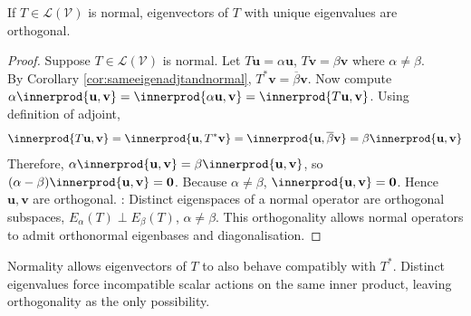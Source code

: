 \begin{corollary} \label{cor:normaleigenvectororthogonal} If  $T \in \mathcal{L}(\mathcal{V})$ is normal, eigenvectors of $T$ with unique eigenvalues are orthogonal.
\begin{proof} Suppose $T \in \mathcal{L}(\mathcal{V})$ is normal. Let $T \mathbf{u} = \alpha \mathbf{u}$, $T \mathbf{v} = \beta \mathbf{v}$ where $\alpha \neq \beta$.\\
By Corollary \ref{cor:sameeigenadjtandnormal}, $T^* \mathbf{v} = \overline{\beta}\mathbf{v}$. Now compute $\alpha \innerprod{\mathbf{u}, \mathbf{v}} = \innerprod{\alpha \mathbf{u}, \mathbf{v}} = \innerprod{T \mathbf{u}, \mathbf{v}}$. Using definition of adjoint,
\begin{align}
\innerprod{T \mathbf{u}, \mathbf{v}} = \innerprod{\mathbf{u}, T^* \mathbf{v}} = \innerprod{\mathbf{u}, \overline{\beta}\mathbf{v}} = \beta \innerprod{\mathbf{u}, \mathbf{v}} \nonumber
\end{align}
Therefore, $\alpha \innerprod{\mathbf{u}, \mathbf{v}} = \beta \innerprod{\mathbf{u}, \mathbf{v}}$, so $(\alpha - \beta)\innerprod{\mathbf{u}, \mathbf{v}} = \mathbf{0}$. Because $\alpha \neq \beta$, $\innerprod{\mathbf{u}, \mathbf{v}} = \mathbf{0}$. Hence $\mathbf{u}, \mathbf{v}$ are orthogonal.
: Distinct eigenspaces of a normal operator are orthogonal subspaces, $E_{\alpha}(T) \perp E_{\beta}(T)$, $\alpha \neq \beta$. This orthogonality allows normal operators to admit orthonormal eigenbases and diagonalisation.
\end{proof}
\end{corollary}

Normality allows eigenvectors of $T$ to also behave compatibly with $T^*$. Distinct eigenvalues force incompatible scalar actions on the same inner product, leaving orthogonality as the only possibility.

